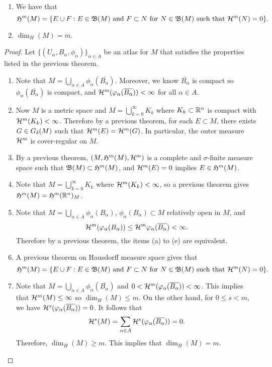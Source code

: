 \documentclass[a4paper]{article}
\renewcommand{\cupinfk}{\bigcup_{k=0}^\infty}
\begin{document}
\begin{thm}
\begin{enumerate}
\item We have that
\begin{equation*}
\mathfrak{H}^m(M) = \{ E\cup F : E \in \mathfrak{B} (M) \text{ and } F
\subset N \text{ for } N \in \mathfrak{B} (M) \text{ such that }
\mathcal{H}^m(N) = 0 \}.
\end{equation*}

\item $\dim_H(M) = m$.
\end{enumerate}
\end{thm}

\begin{proof}
Let $\{(U_\alpha, B_\alpha, \phi_\alpha)\}_{\alpha \in A}$
be an atlas for $M$ that satisfies the properties listed 
in the previous theorem.
\begin{enumerate}
\item Note that $M = \bigcup_{\alpha \in A} 
\phi_\alpha (\bar{B_\alpha})$. Moreover,
we know $\bar{B_\alpha}$ is compact
so $\phi_\alpha (\bar{B_\alpha})$ is compact, and  
$\mathcal{H}^m (\varphi_\alpha (\overline{B_\alpha})) < \infty$
for all $\alpha \in A$.

\item Now $M$ is a metric space and $M = \cupinfk K_k$ 
where $K_k \subset \mathbb{R}^n$ is compact with $\mathcal{H}^m (K_k) < \infty$.
Therefore by a previous theorem, for each $E \subset M$,  
there exists $G \in G_\delta (M)$ such that $\mathcal{H}^m (E)
= \mathcal{H}^m (G)$. In particular, the outer measure 
$\mathcal{H}^m$ is cover-regular on $M$.

\item By a previous theorem, $(M, \mathfrak{H}^m (M), 
\mathcal{H}^m)$ is a complete and $\sigma$-finite measure space such 
that $\mathfrak{B}(M) \subset \mathfrak{H}^m(M)$, and $\mathcal{H}^m (E) = 0$
implies $E \in \mathfrak{H}^m(M)$.

\item Note that $M = \cupinfk K_k$ where $\mathcal{H}^m (K_k) < \infty$, 
so a previous theorem gives $\mathfrak{H}^m (M) = \mathfrak{H}^m 
(\mathbb{R}^n)_M$.

\item Note that $M = \bigcup_{\alpha \in A} \phi_\alpha 
(B_\alpha)$, $\phi_\alpha (B_\alpha) \subset M$ relatively 
open in $M$, and 
\[
\mathcal{H}^m (\varphi_\alpha(B_\alpha)) 
\leq \mathcal{H}^m \varphi_\alpha (\overline{B_\alpha}) < \infty.
\]
Therefore by a previous theorem, 
the items (a) to (e) are equivalent.

\item A previous theorem on Hausdorff measure space 
gives that 
\[
\mathfrak{H}^m (M) = \{E \cup F : \text{$E \in \mathfrak{B}(M)$ 
and $F \subset N$ for $N \in \mathfrak{B}(M)$ such that 
$\mathcal{H}^m(N) = 0$}\}.
\]

\item Note that $M = \bigcup_{\alpha \in A} \phi_\alpha 
(\bar{B_\alpha})$ and $0 < \mathcal{H}^m (\varphi_\alpha (\overline{B_\alpha})) 
< \infty$. This implies that $\mathcal{H}^m (M) \leq \infty$ so 
$\dim_H (M) \leq m$. On the other hand, for $0 \leq s < m$,
we have $\mathcal{H}^s(\varphi_\alpha (\overline{B_\alpha})) = 0$. 
It follows that 
\[
\mathcal{H}^s (M) 
= \sum_{\alpha \in A} \mathcal{H}^s (\varphi_\alpha (\overline{B_\alpha}))
= 0.
\]
Therefore, $\dim_H (M) \geq m$. This implies that 
$\dim_H (M) = m$.
\end{enumerate}
\end{proof}
\end{document}

